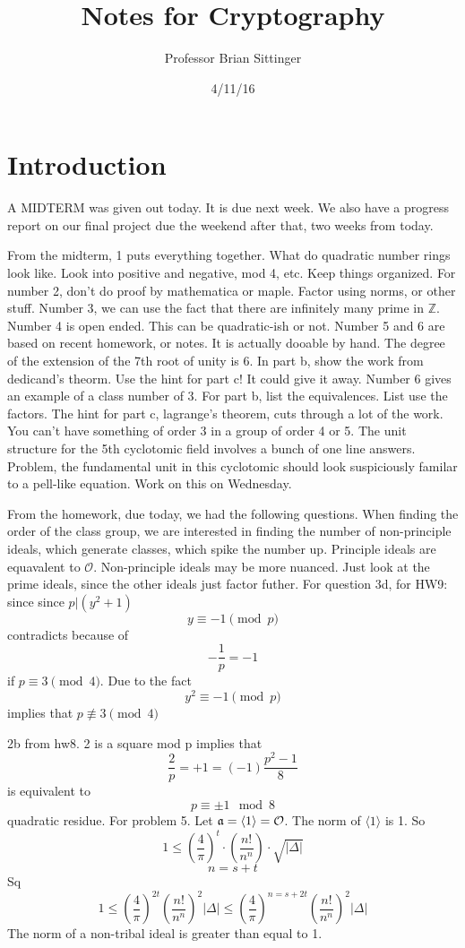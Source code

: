 \documentclass{article}
\title{Notes for Cryptography}
\author{Professor Brian Sittinger}
\date{4/11/16}
\begin{document}
\maketitle
\section{Introduction}
A MIDTERM was given out today. It is due next week. We also have a progress
report on our final project due the weekend after that, two weeks from today.


From the midterm, 1 puts everything together. What do quadratic number rings
look like. Look into positive and negative, mod 4, etc. Keep things organized.
For number 2, don't do proof by mathematica or maple. Factor using norms, or
other stuff. Number 3, we can use the fact that there are infinitely many prime
in $\mathbb{Z}$. Number 4 is open ended. This can be quadratic-ish or not. 
Number 5 and 6 are based on recent homework, or notes. It is actually dooable by
hand. The degree of the extension of the 7th root of unity is 6. In part b, show
the work from dedicand's theorm. Use the hint for part c! It could give it away. 
Number 6 gives an example of a class number of 3. For part b, list the
equivalences. List use the factors. The hint for part c, lagrange's theorem,
cuts through a lot of the work. You can't have something of order 3 in a group
of order 4 or 5. The unit structure for the 5th cyclotomic field involves a
bunch of one line answers. Problem, the fundamental unit in this cyclotomic
should look suspiciously familar to a pell-like equation. Work on this on
Wednesday. 

From the homework, due today, we had the following questions. When finding the
order of the class group, we are interested in finding the number of
non-principle ideals, which generate classes, which spike the number up.
Principle ideals are equavalent to $\mathcal{O}$. Non-principle ideals may be
more nuanced. Just look at the prime ideals, since the other ideals just factor
futher. For question 3d, for HW9: since since $p|(y^2+1)$
\[ y \equiv -1 \pmod{p} \]
contradicts because of
\[ -\frac{1}{p} = -1 \]
if $p \equiv 3 \pmod{4}$. Due to the fact 
\[ y^2 \equiv -1 \pmod{p} \]
implies that $p \not\equiv 3 \pmod 4 $

2b from hw8. 2 is a square mod p implies that 
\[ \frac{2}{p} = +1 = (-1)\frac{p^2 -1 }{8} \]
is equivalent to 
\[ p \equiv \pm 1 \mod 8 \]
quadratic residue. For problem 5. Let $\frak{a} = \langle 1 \rangle =
\mathcal{O}$. The norm of $\langle 1 \rangle$ is 1. So
\[ 1 \leq \left( \frac{4}{\pi} \right)^t \cdot \left( \frac{n!}{n^n} \right)
\cdot \sqrt{|\Delta|} \]
\[ n = s + t \]
Sq
\[ 1 \leq \left(\frac{4}{\pi} \right)^{2t} \left( \frac{n!}{n^n}\right)^2
|\Delta| \leq \left(\frac{4}{\pi} \right)^{n=s+2t} \left( \frac{n!}{n^n}\right)^2
|\Delta|  \]
The norm of a non-tribal ideal is greater than equal to 1. 
\end{document}
